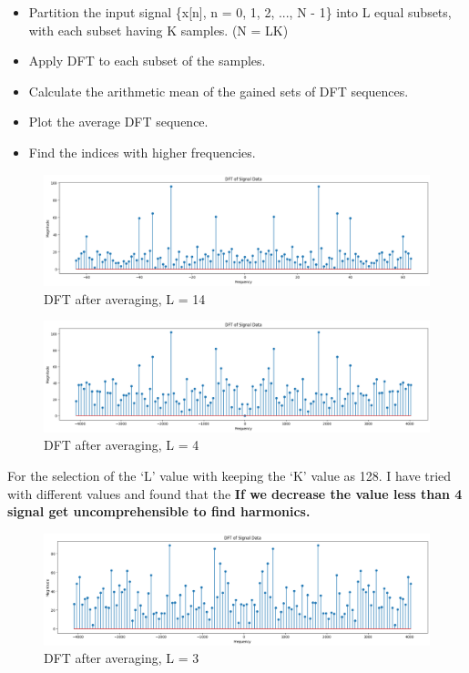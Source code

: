 \documentclass[11pt,a4paper]{article}
\begin{document}
\begin{itemize}
    \item  Partition the input signal \{x[n], n = 0, 1, 2, ..., N - 1\} into L equal subsets, with each subset
    having K samples. (N = LK)
    \item  Apply DFT to each subset of the samples.
    \item  Calculate the arithmetic mean of the gained sets of DFT sequences.
    \item  Plot the average DFT sequence.
    \item Find the indices with higher frequencies.
\end{itemize}


{\begin{figure}[h]
    \centering
    \includegraphics[width=1.0\linewidth]{images/3.png}
    \caption{DFT after averaging, L = 14}
\end{figure}}

{\begin{figure}[h]
    \centering
    \includegraphics[width=1.0\linewidth]{images/3-3.png}
    \caption{DFT after averaging, L = 4}
\end{figure}}

For the selection of the `L' value with keeping the `K' value as 128. I have tried with different values and found that the \textbf{If we decrease the value less than 4 signal get uncomprehensible to find harmonics.} 

\newpage

{\begin{figure}[h]
    \centering
    \includegraphics[width=1.0\linewidth]{images/3-5.png}
    \caption{DFT after averaging, L = 3}
\end{figure}}
\end{document}
